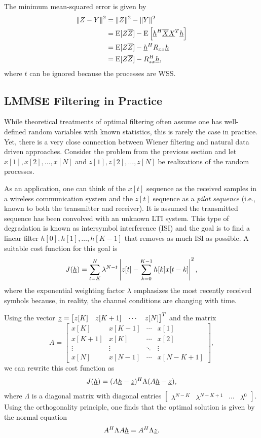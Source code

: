 The minimum mean-squared error is given by
\begin{equation*}
\begin{split}
\| Z-Y \|^2 &= \| Z \|^2 - \| Y \|^2 \\
&= \mathrm{E} [Z \overline{Z}] - \mathrm{E} \left[ \underline{h}^H \overline{\underline{X}} \underline{X}^T \underline{h} \right] \\
&= \mathrm{E} [Z \overline{Z}] - \underline{h}^H R_{xx} \underline{h} \\
&= \mathrm{E} [Z \overline{Z}] - R_{zx}^H \underline{h} ,
\end{split}
\end{equation*}
where $t$ can be ignored because the processes are WSS.


\subsection{LMMSE Filtering in Practice}

While theoretical treatments of optimal filtering often assume one has well-defined random variables with known statistics, this is rarely the case in practice.
Yet, there is a very close connection between Wiener filtering and natural data driven approaches.
Consider the problem from the previous section and let $x[1], x[2], \ldots, x[N]$ and $z[1], z[2], \ldots, z[N]$ be realizations of the random processes.

As an application, one can think of the $x[t]$ sequence as the received samples in a wireless communication system and the $z[t]$ sequence as a \emph{pilot sequence} (i.e., known to both the transmitter and receiver).
It is assumed the transmitted sequence has been convolved with an unknown LTI system.
This type of degradation is known as intersymbol interference (ISI) and the goal is to find a linear filter $h[0],h[1],\ldots,h[K-1]$ that removes as much ISI as possible.
A suitable cost function for this goal is
\[ J(\underline{h}) = \sum_{t=K}^N \lambda^{N-t} \left| z[t] - \sum_{k=0}^{K-1} h[k] x[t-k] \right|^2, \]
where the exponential weighting factor $\lambda$ emphasizes the most recently received symbols because, in reality, the channel conditions are changing with time.

Using the vector $\underline{z} = \begin{bmatrix} z[K] & z[K+1] & \cdots & z[N] \end{bmatrix}^T$ and the matrix
\[ A = \begin{bmatrix} x[K] & x[K-1] & \cdots & x[1] \\ x[K+1] & x[K] & \cdots & x[2] \\ \vdots & \vdots & \ddots & \vdots \\ x[N] & x[N-1] & \cdots & x[N-K+1] \end{bmatrix} , \]
we can rewrite this cost function as
\[ J(\underline{h}) = (A\underline{h}-\underline{z})^H \Lambda (A\underline{h}-\underline{z}), \]
where $\Lambda$ is a diagonal matrix with diagonal entries $\begin{bmatrix} \lambda^{N-K} & \lambda^{N-K+1} & \cdots & \lambda^0 \end{bmatrix}$.
Using the orthogonality principle, one finds that the optimal solution is given by the normal equation
\[ A^H \Lambda A \underline{h} = A^H \Lambda \underline{z}. \]

